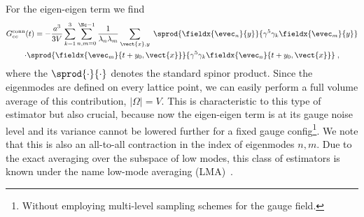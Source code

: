 For the eigen-eigen term we find
\begin{multline} \label{eq:Gconn:eigen-eigen}
G_{ee}^{\text{conn}}(t)
= - \frac{a^{3}}{3 V}
\sum_{k=1}^{3}
\sum_{n,m=0}^{\Nc-1} \frac{1}{\lambda_{n} \lambda_{m}}
\sum_{\vect{x},y} \;
\sprod{
  \fieldx{\evec_{n}}{y}
}{
  \gamma^{5}
  \gamma_k
  \fieldx{\evec_{m}}{y}
} \\
\cdot
\sprod{
  \fieldx{\evec_{m}}{t+y_0, \vect{x}}
}{
  \gamma^{5}
  \gamma_k
  \fieldx{\evec_{n}}{t+y_0, \vect{x}}
} \;,
\end{multline}
where the $\sprod{\cdot}{\cdot}$ denotes the standard spinor product.
Since the eigenmodes are defined on every lattice point, we can easily perform a full volume average of this contribution, $\lvert \Omega \rvert = V$.
This is characteristic to this type of estimator but also crucial, because now the eigen-eigen term is at its gauge noise level and its variance cannot be lowered further for a fixed gauge config\footnote{Without employing multi-level sampling schemes for the gauge field.}.
We note that this is also an all-to-all contraction in the index of eigenmodes $n,m$.
Due to the exact averaging over the subspace of low modes, this class of estimators is known under the name low-mode averaging (LMA)~\cite{Neff_2001,Giusti_2004,DeGrand_2004}.

